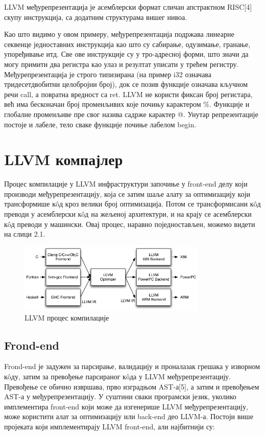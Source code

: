 \documentclass[12pt,oneside]{memoir}
\begin{document}
LLVM међурепрезентација је асемблерски формат сличан апстрактном RISC[4] скупу
инструкција, са додатним структурама вишег нивоа.

Као што видимо у овом примеру, међурепрезентација подржава линеарне секвенце
једноставних инструкција као што су сабирање, одузимање, гранање, упоређивање итд.
Све ове инструкције су у тро-адресној форми, што значи да могу примити два регистра 
као улаз и резултат уписати у трећем регистру.
Међурепрезентација је строго типизирана (на пример i32 означава тридесетдвобитни
целобројни број), док се позив функције означава кључном речи call, а повратна
вредност са ret.
LLVM не користи фиксан број регистара, већ има бесконачан број променљивих које
почињу карактером \%. 
Функције и глобалне променљиве пре свог назива садрже карактер @.
Унутар репрезентације постоје и лабеле, тело сваке функције почиње лабелом begin.

\section{LLVM компајлер}  

Процес компилације у LLVM инфраструктури започиње у front-end делу који производи
међурепрезентацију, која се затим шаље алату за оптимизацију који трансформише
к\^{o}д кроз велики број оптимизација.
Потом се трансформисани к\^{o}д преводи у асемблерски к\^{o}д на жељеној архитектури, 
и на крају се асемблерски к\^{o}д преводи у машински. 
Овај процес, наравно поједностављен, можемо видети на слици 2.1. 

\begin{figure}[!ht]
  \centering
  \includegraphics[width=0.8\textwidth]{LLVMCompiler1.png}
  \caption{LLVM процес компилације}
  \label{fig:grafikon}
\end{figure}

\subsection{Frond-end}
 Frond-end је задужен за парсирање, валидацију и проналазак грешака у изворном
 к\^{o}ду, затим за превођење парсираног к\^{o}да у LLVM међурепрезентацију.
 Превођење се обично извршава, прво изградњом AST-а[5], а затим 
 и превођењем AST-а у међурепрезентацију.
 У суштини сваки програмски језик, уколико имплементира front-end који може да
 изгенерише LLVM међурепрезентацију, може користити алат за оптимизацију или 
 back-end део LLVM-а.
 Постоји више пројеката који имплементирају LLVM front-end, али најбитнији су:
 
\end{document}
